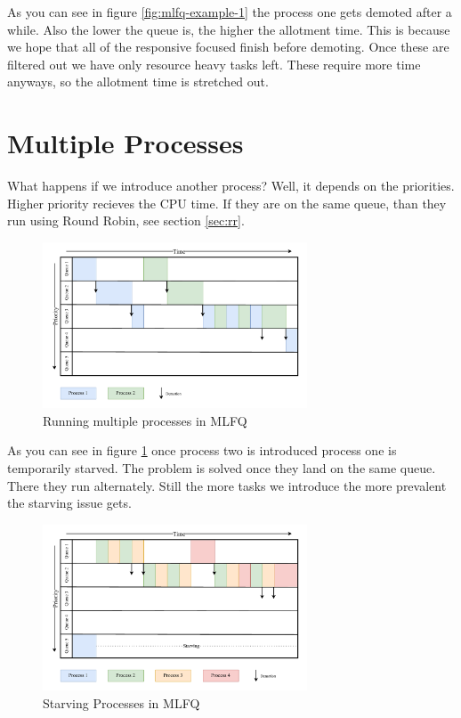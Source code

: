 As you can see in figure \ref{fig:mlfq-example-1} the process one gets demoted after a while.
Also the lower the queue is, the higher the allotment time. 
This is because we hope that all of the responsive focused finish before demoting.
Once these are filtered out we have only resource heavy tasks left.
These require more time anyways, so the allotment time is stretched out.

\section{Multiple Processes}

What happens if we introduce another process?
Well, it depends on the priorities. 
Higher priority recieves the CPU time.
If they are on the same queue, than they run using Round Robin, see section \ref{sec:rr}.


\begin{figure}[h]
    \centering
    \includegraphics[width=0.7\textwidth]{Assets/MLFQ-Example-2.pdf}
    \caption{Running multiple processes in MLFQ}
    \label{fig:mlfq-example-2}
\end{figure}

As you can see in figure \ref{fig:mlfq-example-2} once process two is introduced process one is temporarily starved. The problem is solved once they land on the same queue.
There they run alternately.
Still the more tasks we introduce the more prevalent the starving issue gets.

\begin{figure}[h]
    \centering
    \includegraphics[width=0.7\textwidth]{Assets/MLFQ-Example-3.pdf}
    \caption{Starving Processes in MLFQ}
    \label{fig:mlfq-example-3}
\end{figure}

